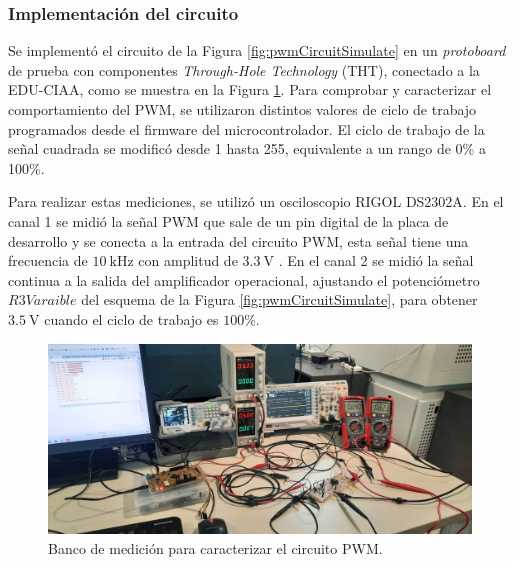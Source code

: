 \subsubsection{Implementación del circuito}

Se implementó el circuito de la Figura \ref{fig:pwmCircuitSimulate} en un \textit{protoboard} de prueba con componentes \textit{Through-Hole Technology} (THT), conectado a la EDU-CIAA, como se muestra en la Figura \ref{fig:BancoMedicion1}. Para comprobar y caracterizar el comportamiento del PWM, se utilizaron distintos valores de ciclo de trabajo programados desde el firmware del microcontrolador. El ciclo de trabajo de la señal cuadrada se modificó desde 1 hasta 255, equivalente a un rango de 0\% a 100\%.

Para realizar estas mediciones, se utilizó un osciloscopio RIGOL DS2302A. En el canal 1 se midió la señal PWM que sale de un pin digital de la placa de desarrollo y se conecta a la entrada del circuito PWM, esta señal tiene una frecuencia de $\SI{10}{\kilo\hertz}$ con amplitud de $\SI{3.3}{\volt}$ . En el canal 2 se midió la señal continua a la salida del amplificador operacional, ajustando el potenciómetro $R3Varaible$ del esquema de la Figura \ref{fig:pwmCircuitSimulate}, para obtener $\SI{3.5}{\volt}$ cuando el ciclo de trabajo es $100\%$.


\begin{figure}[H]
    \centering
    \includegraphics[width=1\linewidth]{Figuras/datalogger/Hardware/BancoMedicion1.jpg}
    \caption{Banco de medición para caracterizar el circuito PWM.}
    \label{fig:BancoMedicion1}
\end{figure}

